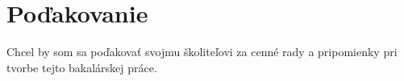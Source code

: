 \chapter{Poďakovanie}
\vfil
Chcel by som sa poďakovať svojmu školiteľovi \supervisor za cenné rady a pripomienky pri tvorbe tejto bakalárskej práce.
